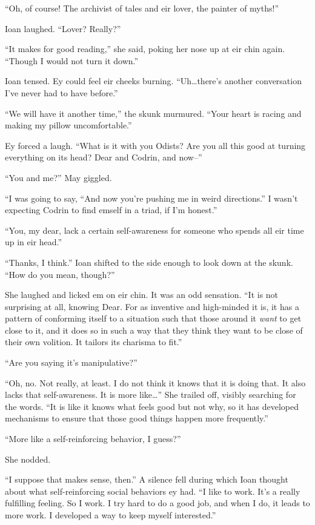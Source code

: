 ``Oh, of course! The archivist of tales and eir lover, the painter of myths!''

Ioan laughed. ``Lover? Really?''

``It makes for good reading,'' she said, poking her nose up at eir chin again. ``Though I would not turn it down.''

Ioan tensed. Ey could feel eir cheeks burning. ``Uh\ldots there's another conversation I've never had to have before.''

``We will have it another time,'' the skunk murmured. ``Your heart is racing and making my pillow uncomfortable.''

Ey forced a laugh. ``What is it with you Odists? Are you all this good at turning everything on its head? Dear and Codrin, and now--''

``You and me?'' May giggled.

``I was going to say, ``And now you're pushing me in weird directions.'' I wasn't expecting Codrin to find emself in a triad, if I'm honest.''

``You, my dear, lack a certain self-awareness for someone who spends all eir time up in eir head.''

``Thanks, I think.'' Ioan shifted to the side enough to look down at the skunk. ``How do you mean, though?''

She laughed and licked em on eir chin. It was an odd sensation. ``It is not surprising at all, knowing Dear. For as inventive and high-minded it is, it has a pattern of conforming itself to a situation such that those around it \emph{want} to get close to it, and it does so in such a way that they think they want to be close of their own volition. It tailors its charisma to fit.''

``Are you saying it's manipulative?''

``Oh, no. Not really, at least. I do not think it knows that it is doing that. It also lacks that self-awareness. It is more like\ldots{}'' She trailed off, visibly searching for the words. ``It is like it knows what feels good but not why, so it has developed mechanisms to ensure that those good things happen more frequently.''

``More like a self-reinforcing behavior, I guess?''

She nodded.

``I suppose that makes sense, then.'' A silence fell during which Ioan thought about what self-reinforcing social behaviors ey had. ``I like to work. It's a really fulfilling feeling. So I work. I try hard to do a good job, and when I do, it leads to more work. I developed a way to keep myself interested.''

